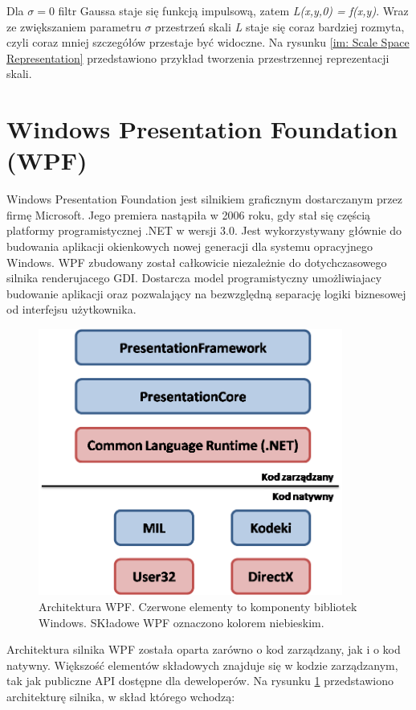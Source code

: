 Dla $\sigma = 0$ filtr Gaussa staje się funkcją impulsową, zatem \textit{L(x,y,0) = f(x,y)}. Wraz ze zwiększaniem parametru $\sigma$ przestrzeń skali \textit{L} staje się coraz bardziej rozmyta, czyli coraz mniej szczegółów przestaje być widoczne. Na rysunku \ref{im: Scale Space Representation} przedstawiono przykład tworzenia przestrzennej reprezentacji skali.

\section{Windows Presentation Foundation (WPF)}
\label{sec: WPF}
Windows Presentation Foundation jest silnikiem graficznym dostarczanym przez firmę Microsoft. Jego premiera nastąpiła w 2006 roku, gdy stał się częścią platformy programistycznej .NET w wersji 3.0.  Jest wykorzystywany głównie do budowania aplikacji okienkowych nowej generacji dla systemu opracyjnego Windows. WPF zbudowany został całkowicie niezależnie do dotychczasowego silnika renderujacego GDI. Dostarcza model programistyczny umożliwiajacy budowanie aplikacji oraz pozwalający na bezwzględną separację logiki biznesowej od interfejsu użytkownika. 

\begin{figure}[h]
	\includegraphics[width=10cm]{WpfArchitecture}
	\centering
	\caption{Architektura WPF. Czerwone elementy to komponenty bibliotek Windows. SKładowe WPF oznaczono kolorem niebieskim.}
	\label{im: WpfArchitecture}
\end{figure} 

Architektura silnika WPF została oparta zarówno o kod zarządzany, jak i o kod natywny.  Większość elementów składowych znajduje się w kodzie zarządzanym, tak jak publiczne API dostępne dla deweloperów. Na rysunku \ref{im: WpfArchitecture} przedstawiono architekturę silnika, w skład którego wchodzą:

